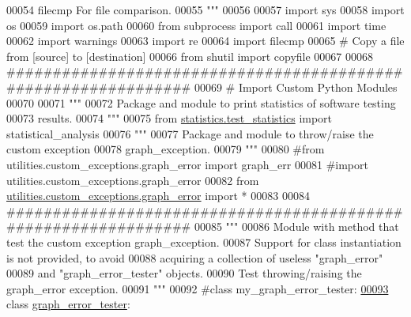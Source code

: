 \begin{DoxyCode}
00054 \textcolor{stringliteral}{    filecmp     For file comparison.}
00055 \textcolor{stringliteral}{"""}
00056 
00057 \textcolor{keyword}{import} sys
00058 \textcolor{keyword}{import} os
00059 \textcolor{keyword}{import} os.path
00060 \textcolor{keyword}{from} subprocess \textcolor{keyword}{import} call
00061 \textcolor{keyword}{import} time
00062 \textcolor{keyword}{import} warnings
00063 \textcolor{keyword}{import} re
00064 \textcolor{keyword}{import} filecmp
00065 \textcolor{comment}{# Copy a file from [source] to [destination]}
00066 \textcolor{keyword}{from} shutil \textcolor{keyword}{import} copyfile
00067 
00068 \textcolor{comment}{###############################################################}
00069 \textcolor{comment}{#   Import Custom Python Modules}
00070 
00071 \textcolor{stringliteral}{"""}
00072 \textcolor{stringliteral}{    Package and module to print statistics of software testing}
00073 \textcolor{stringliteral}{        results.}
00074 \textcolor{stringliteral}{"""}
00075 \textcolor{keyword}{from} \hyperlink{namespacestatistics_1_1test__statistics}{statistics.test\_statistics} \textcolor{keyword}{import} statistical\_analysis
00076 \textcolor{stringliteral}{"""}
00077 \textcolor{stringliteral}{    Package and module to throw/raise the custom exception}
00078 \textcolor{stringliteral}{        graph\_exception.}
00079 \textcolor{stringliteral}{"""}
00080 \textcolor{comment}{#from utilities.custom\_exceptions.graph\_error import graph\_err}
00081 \textcolor{comment}{#import utilities.custom\_exceptions.graph\_error}
00082 \textcolor{keyword}{from} \hyperlink{namespaceutilities_1_1custom__exceptions_1_1graph__error}{utilities.custom\_exceptions.graph\_error} \textcolor{keyword}{import} *
00083 
00084 \textcolor{comment}{###############################################################}
00085 \textcolor{stringliteral}{"""}
00086 \textcolor{stringliteral}{    Module with method that test the custom exception graph\_exception.}
00087 \textcolor{stringliteral}{    Support for class instantiation is not provided, to avoid}
00088 \textcolor{stringliteral}{        acquiring a collection of useless "graph\_error"}
00089 \textcolor{stringliteral}{        and "graph\_error\_tester" objects.}
00090 \textcolor{stringliteral}{    Test throwing/raising the graph\_error exception.}
00091 \textcolor{stringliteral}{"""}
00092 \textcolor{comment}{#class my\_graph\_error\_tester:}
\hypertarget{graph__error__tester_8py_source_l00093}{}\hyperlink{classutilities_1_1custom__exceptions_1_1graph__error__tester_1_1graph__error__tester}{00093} \textcolor{keyword}{class }\hyperlink{classutilities_1_1custom__exceptions_1_1graph__error__tester_1_1graph__error__tester}{graph\_error\_tester}:

\end{DoxyCode}
